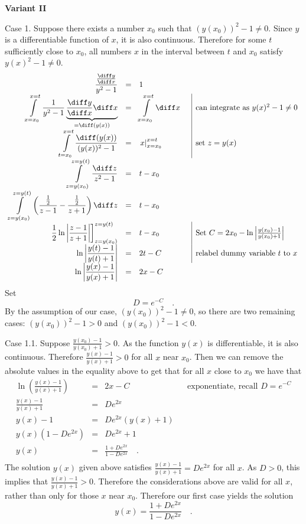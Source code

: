 {\textbf{Variant II}

\noindent Case 1. Suppose there exists a number $x_0$ such that $(y(x_0) )^2 - 1\neq 0$. Since $y$ is a differentiable function of $x$, it is also continuous. Therefore for some $t$ sufficiently close to $x_0$, all numbers $x$ in the interval between $t$ and $x_0$ satisfy $ y(x)^2-1\neq 0$.
\[
\begin{array}{rcll|l}
\displaystyle \frac{\frac{ \diff y}{ \diff x}}{y^2-1}&=&1 \\
\displaystyle\int\limits_{x=x_0}^{x=t} \frac{1}{ y^2- 1} \underbrace{ \frac{\diff y}{\diff x}\diff x}_{=\diff (y(x)) }&=&\displaystyle\int\limits_{x=x_0}^{x=t}\diff x &&\text{can integrate as }  y(x)^2-1\neq 0\\
\displaystyle\int\limits_{t=x_0 }^{x=t} \frac{\diff (y(x))}{ (y(x))^2-1}& =& \displaystyle\left.x \right|_{ x=x_0}^{x=t} &&\text{set } z=y(x)\\
\displaystyle\int\limits_{z=y(x_0) }^{z=y(t)} \frac{\diff z}{ z^2-1}& =& \displaystyle t-x_0 \\
\displaystyle\int\limits_{z=y(x_0)}^{z=y(t)} \left(\frac{\frac12 }{z-1}- \frac{\frac12}{z+1}\right)\diff z&=& t-x_0
\\
\displaystyle\left .\frac{1}2 \ln \left|\frac{z-1}{z+1}\right|\right]_{z=y(x_0)}^{z=y(t)}&=& t-x_0 && \text{Set } C=2x_0-  \ln \left|\frac{y(x_0)-1}{ y(x_0)+ 1} \right|\\
\displaystyle \ln \left|\frac{y(t)-1}{y(t)+1}\right|&=& 2t - C&&\text{relabel dummy variable } t \text { to } x \\
\displaystyle
\ln \left|\frac{y(x)-1}{y(x)+1}\right|&=& 2x - C
\end{array}
\]
Set
\[
D=e^{-C}\quad .
\]
By the assumption of our case, $ (y(x_0))^2-1\neq 0$, so there are two remaining cases: $ (y(x_0))^2-1>0$ and $ (y(x_0))^2-1<0$.

\noindent Case 1.1. Suppose $\displaystyle \frac{y(x_0)-1}{ y(x_0)+1}>0$. As the function $y(x)$ is differentiable, it is also continuous. Therefore $\displaystyle \frac{y(x)-1}{y(x)+1}>0$ for all $x$ near $x_0$. Then we can remove the absolute values in the equality above to get that for all $x$ close to $x_0$ we have that
\[
\begin{array}{rcll|l}
\displaystyle \ln \left(\frac{y(x)-1}{y(x)+1}\right)&=& 2x - C&&\text{exponentiate, recall }D=e^{-C}\\
\displaystyle \frac{y(x)-1}{y(x)+1}&=& D e^{2x}\\
\displaystyle y(x)-1&=&\displaystyle  De^{2x}(y(x)+1)\\
\displaystyle y(x)\left(1- De^{2x}\right)&=&\displaystyle  De^{2x}+1\\
\displaystyle y(x)&=&\displaystyle  \frac{ 1+De^{2x}}{1- De^{2x}}\quad .\\
\end{array}
\]
The solution $y(x)$ given above satisfies $\displaystyle \frac{y(x)-1}{y(x)+1}= De^{2x}$ for all $x$. As $D>0$, this implies that $\displaystyle \frac{y(x)-1}{ y(x)+1}>0$. Therefore the considerations above are valid for all $x$, rather than only for those $x$ near $x_0$. Therefore our first case yields the solution
\[
y(x)=\frac{ 1+De^{2x}}{1- De^{2x}}\quad .
\]

}
